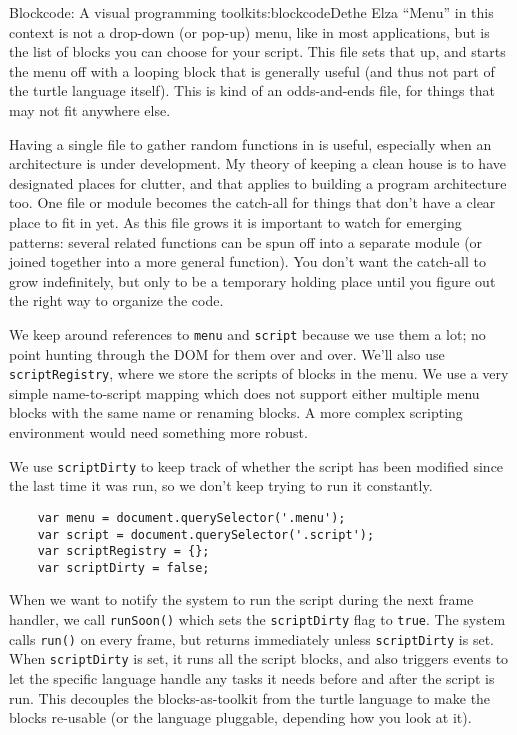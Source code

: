 \begin{aosachapter}{Blockcode: A visual programming toolkit}{s:blockcode}{Dethe Elza}
``Menu'' in this context is not a drop-down (or pop-up) menu, like in
most applications, but is the list of blocks you can choose for your
script. This file sets that up, and starts the menu off with a looping
block that is generally useful (and thus not part of the turtle language
itself). This is kind of an odds-and-ends file, for things that may not
fit anywhere else.

Having a single file to gather random functions in is useful, especially
when an architecture is under development. My theory of keeping a clean
house is to have designated places for clutter, and that applies to
building a program architecture too. One file or module becomes the
catch-all for things that don't have a clear place to fit in yet. As
this file grows it is important to watch for emerging patterns: several
related functions can be spun off into a separate module (or joined
together into a more general function). You don't want the catch-all to
grow indefinitely, but only to be a temporary holding place until you
figure out the right way to organize the code.

We keep around references to \texttt{menu} and \texttt{script} because
we use them a lot; no point hunting through the DOM for them over and
over. We'll also use \texttt{scriptRegistry}, where we store the scripts
of blocks in the menu. We use a very simple name-to-script mapping which
does not support either multiple menu blocks with the same name or
renaming blocks. A more complex scripting environment would need
something more robust.

We use \texttt{scriptDirty} to keep track of whether the script has been
modified since the last time it was run, so we don't keep trying to run
it constantly.

\begin{verbatim}
    var menu = document.querySelector('.menu');
    var script = document.querySelector('.script');
    var scriptRegistry = {};
    var scriptDirty = false;
\end{verbatim}

When we want to notify the system to run the script during the next
frame handler, we call \texttt{runSoon()} which sets the
\texttt{scriptDirty} flag to \texttt{true}. The system calls
\texttt{run()} on every frame, but returns immediately unless
\texttt{scriptDirty} is set. When \texttt{scriptDirty} is set, it runs
all the script blocks, and also triggers events to let the specific
language handle any tasks it needs before and after the script is run.
This decouples the blocks-as-toolkit from the turtle language to make
the blocks re-usable (or the language pluggable, depending how you look
at it).


\end{aosachapter}
